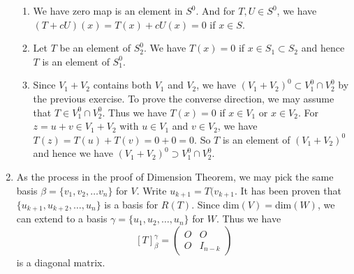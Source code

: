 \begin{enumerate}
\begin{enumerate}
\item We have zero map is an element in $S^0$. And for $T,U\in S^0$, we have $(T+cU)(x)=T(x)+cU(x)=0$ if $x\in S$.
\item Let $T$ be an element of $S_2^0$. We have $T(x)=0$ if $x\in S_1\subset S_2$ and hence $T$ is an element of $S_1^0$.
\item Since $V_1+V_2$ contains both $V_1$ and $V_2$, we have $(V_1+V_2)^0\subset V_1^0\cap V_2^0$ by the previous exercise. To prove the converse direction, we may assume that  $T\in V_1^0\cap V_2^0$. Thus we have $T(x)=0$ if $x\in V_1$ or $x\in V_2$. For $z=u+v\in V_1+V_2$ with $u\in V_1$ and $v\in V_2$, we have $T(z)=T(u)+T(v)=0+0=0$. So $T$ is an element of $(V_1+V_2)^0$ and hence we have $(V_1+V_2)^0\supset V_1^0\cap V_2^0$.
\end{enumerate}
\item As the process in the proof of Dimension Theorem, we may pick the same basis $\beta =\{v_1,v_2,\ldots v_n\}$ for $V$. Write $u_{k+1}=T(v_{k+1}$. It has been proven that $\{u_{k+1},u_{k+2},\ldots ,u_{n}\}$ is a basis for $R(T)$. Since dim$(V)=$dim$(W)$, we can extend to a basis $\gamma =\{u_1,u_2,\ldots ,u_n\}$ for $W$. Thus we have 
\[[T]_{\beta }^{\gamma}=\left(\begin{array}{cc}O&O\\O&I_{n-k} \end{array}\right) \]
is a diagonal matrix.
\end{enumerate}
